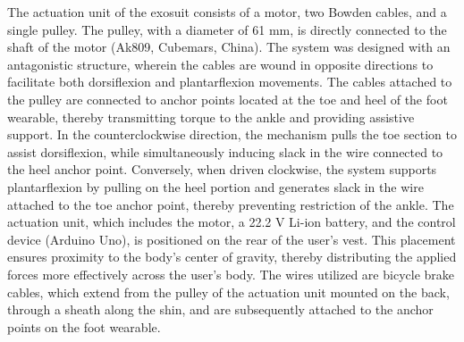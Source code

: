 \documentclass[actuators,article,accept,pdftex,moreauthors]{Definitions/mdpi}
\begin{document}
The actuation unit of the exosuit consists of a motor, two Bowden cables, and a single pulley. The pulley, with a diameter of 61 mm, is directly connected to the shaft of the motor (Ak809, Cubemars, China). The system was designed with an antagonistic structure, wherein the cables are wound in opposite directions to facilitate both dorsiflexion and plantarflexion movements. The cables attached to the pulley are connected to anchor points located at the toe and heel of the foot wearable, thereby transmitting torque to the ankle and providing assistive support. In the counterclockwise direction, the mechanism pulls the toe section to assist dorsiflexion, while simultaneously inducing slack in the wire connected to the heel anchor point. Conversely, when driven clockwise, the system supports plantarflexion by pulling on the heel portion and generates slack in the wire attached to the toe anchor point, thereby preventing restriction of the ankle. The actuation unit, which includes the motor, a 22.2 V Li-ion battery, and the control device (Arduino Uno), is positioned on the rear of the user's vest. This placement ensures proximity to the body's center of gravity, thereby distributing the applied forces more effectively across the user's body. The wires utilized are bicycle brake cables, which extend from the pulley of the actuation unit mounted on the back, through a sheath along the shin, and are subsequently attached to the anchor points on the foot wearable.
\end{document}

